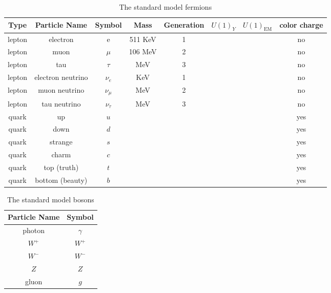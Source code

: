 \begin{table}
  \centering
  \begin{tabular}{c c c c c c c c}
    Type    & Particle Name     & Symbol    & Mass    & Generation  & $U(1)_Y$  & $U(1)_{\mbox{EM}}$  & color charge  \\
    \hline
    lepton  & electron          & e         & 511 KeV & 1           &           &                     & no            \\
    lepton  & muon              & $\mu$     & 106 MeV & 2           &           &                     & no            \\
    lepton  & tau               & $\tau$    &     MeV & 3           &           &                     & no            \\
    lepton  & electron neutrino & $\nu_e$   &     KeV & 1           &           &                     & no            \\
    lepton  & muon neutrino     & $\nu_\mu$ &     MeV & 2           &           &                     & no            \\
    lepton  & tau neutrino      & $\nu_\tau$&     MeV & 3           &           &                     & no            \\
    quark   & up                & $u$       &         &             &           &                     & yes           \\
    quark   & down              & $d$       &         &             &           &                     & yes           \\
    quark   & strange           & $s$       &         &             &           &                     & yes           \\
    quark   & charm             & $c$       &         &             &           &                     & yes           \\
    quark   & top (truth)       & $t$       &         &             &           &                     & yes           \\
    quark   & bottom (beauty)   & $b$       &         &             &           &                     & yes           
  \end{tabular}
  \label{table:fermions}
  \caption{The standard model fermions}
\end{table}

\begin{table}
  \centering
  \begin{tabular}{c c}
    Particle Name & Symbol    \\
    \hline
    photon        & $\gamma$  \\
    $W^+$         & $W^+$     \\
    $W^-$         & $W^-$     \\
    $Z$           & $Z$       \\
    gluon         & $g$       
  \end{tabular}
  \label{table:bosons}
  \caption{The standard model bosons}
\end{table}
